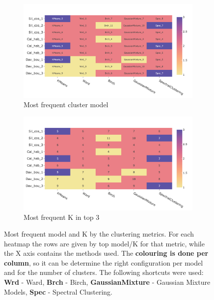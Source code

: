\begin{figure}[!htb]
    \captionsetup[subfigure]{justification=Centering}
    \centering
    \begin{subfigure}[!t]{0.75\textwidth}
        \includegraphics[width=\textwidth]{Sections/ClusteringAnalysis/Resources/cs_top3/top3_cs_gen_top3_heatmap_pca.png}
        \caption{Most frequent cluster model}
        \label{fig:cs:heatmap_gen}
    \end{subfigure}
    \centering
    \begin{subfigure}[!t]{0.75\textwidth}
        \includegraphics[width=\textwidth]{Sections/ClusteringAnalysis/Resources/cs_top3/top3_cs_size_top3_heatmap_pca.png}
        \caption{Most frequent K in top 3}
        \label{fig:cs:heatmap_cs}
    \end{subfigure}
    \caption{Most frequent model and K by the clustering metrics. For each heatmap the rows are given by top model/K for that metric, while the X axis contains the methods used. The \textbf{colouring is done per column}, so it can be determine the right configuration per model and for the number of clusters. The following shortcuts were used: \textbf{Wrd} - Ward, \textbf{Brch} - Birch, \textbf{GaussianMixture} - Gaussian Mixture Models, \textbf{Spec} - Spectral Clustering.}
    \label{fig:cs:cs_metrics_heatmap}
\end{figure}


